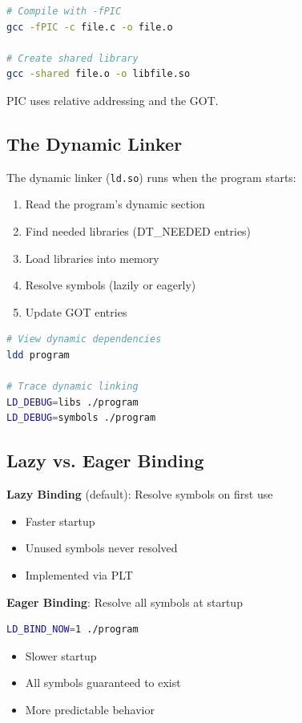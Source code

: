 \begin{lstlisting}[language=bash]
# Compile with -fPIC
gcc -fPIC -c file.c -o file.o

# Create shared library
gcc -shared file.o -o libfile.so
\end{lstlisting}

PIC uses relative addressing and the GOT.

\subsection{The Dynamic Linker}

The dynamic linker (\texttt{ld.so}) runs when the program starts:

\begin{enumerate}
    \item Read the program's dynamic section
    \item Find needed libraries (DT\_NEEDED entries)
    \item Load libraries into memory
    \item Resolve symbols (lazily or eagerly)
    \item Update GOT entries
\end{enumerate}

\begin{lstlisting}[language=bash]
# View dynamic dependencies
ldd program

# Trace dynamic linking
LD_DEBUG=libs ./program
LD_DEBUG=symbols ./program
\end{lstlisting}

\subsection{Lazy vs. Eager Binding}

\textbf{Lazy Binding} (default): Resolve symbols on first use
\begin{itemize}
    \item Faster startup
    \item Unused symbols never resolved
    \item Implemented via PLT
\end{itemize}

\textbf{Eager Binding}: Resolve all symbols at startup
\begin{lstlisting}[language=bash]
LD_BIND_NOW=1 ./program
\end{lstlisting}
\begin{itemize}
    \item Slower startup
    \item All symbols guaranteed to exist
    \item More predictable behavior
\end{itemize}

